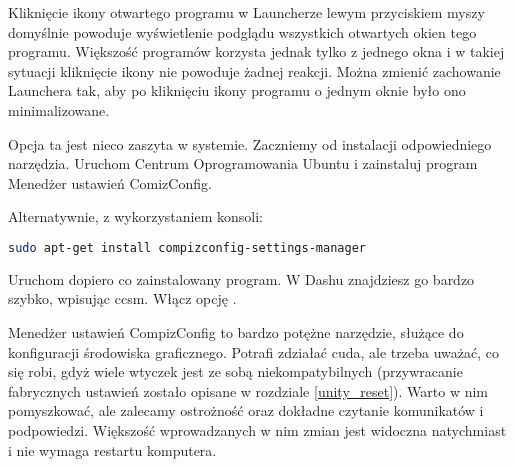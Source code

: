 Kliknięcie ikony otwartego programu w Launcherze lewym przyciskiem myszy domyślnie powoduje wyświetlenie podglądu wszystkich otwartych okien tego programu. Większość programów korzysta jednak tylko z jednego okna i w takiej sytuacji kliknięcie ikony nie powoduje żadnej reakcji. Można zmienić zachowanie Launchera tak, aby po kliknięciu ikony programu o jednym oknie było ono minimalizowane.

Opcja ta jest nieco zaszyta w systemie. Zaczniemy od instalacji odpowiedniego narzędzia. Uruchom \textcolor{ubuntu_orange}{Centrum Oprogramowania Ubuntu} i zainstaluj program \textcolor{ubuntu_orange}{Menedżer ustawień ComizConfig}.

Alternatywnie, z wykorzystaniem konsoli:
\begin{lstlisting}[language=bash]
sudo apt-get install compizconfig-settings-manager
\end{lstlisting}

Uruchom dopiero co zainstalowany program. W Dashu znajdziesz go bardzo szybko, wpisując \textcolor{ubuntu_orange}{ccsm}. Włącz opcję .

Menedżer ustawień CompizConfig to bardzo potężne narzędzie, służące do konfiguracji środowiska graficznego. Potrafi zdziałać cuda, ale trzeba uważać, co się robi, gdyż wiele wtyczek jest ze sobą niekompatybilnych (przywracanie fabrycznych ustawień zostało opisane w rozdziale \ref{unity_reset}). Warto w nim pomyszkować, ale zalecamy ostrożność oraz dokładne czytanie komunikatów i podpowiedzi. Większość wprowadzanych w nim zmian jest widoczna natychmiast i nie wymaga restartu komputera.
